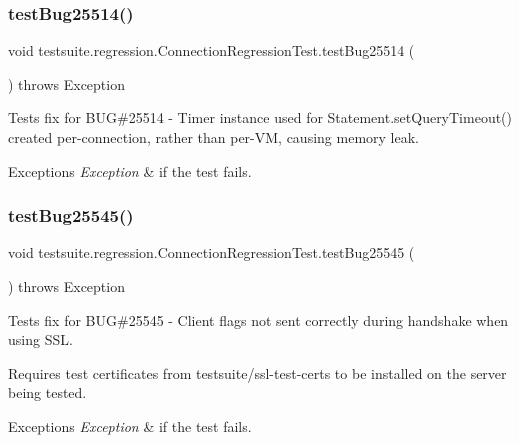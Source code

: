 \subsubsection{\texorpdfstring{test\+Bug25514()}{testBug25514()}}
{\footnotesize\ttfamily void testsuite.\+regression.\+Connection\+Regression\+Test.\+test\+Bug25514 (\begin{DoxyParamCaption}{ }\end{DoxyParamCaption}) throws Exception}

Tests fix for B\+UG\#25514 -\/ Timer instance used for Statement.\+set\+Query\+Timeout() created per-\/connection, rather than per-\/\+VM, causing memory leak.


\begin{DoxyExceptions}{Exceptions}
{\em Exception} & if the test fails. \\
\hline
\end{DoxyExceptions}
\mbox{\label{classtestsuite_1_1regression_1_1_connection_regression_test_a98a44b0432aebd94026747e6fce76282}} 
\subsubsection{\texorpdfstring{test\+Bug25545()}{testBug25545()}}
{\footnotesize\ttfamily void testsuite.\+regression.\+Connection\+Regression\+Test.\+test\+Bug25545 (\begin{DoxyParamCaption}{ }\end{DoxyParamCaption}) throws Exception}

Tests fix for B\+UG\#25545 -\/ Client flags not sent correctly during handshake when using S\+SL.

Requires test certificates from testsuite/ssl-\/test-\/certs to be installed on the server being tested.


\begin{DoxyExceptions}{Exceptions}
{\em Exception} & if the test fails. \\
\hline
\end{DoxyExceptions}
\mbox{\label{classtestsuite_1_1regression_1_1_connection_regression_test_af42d87028dfc5fe504f1cf4457c21d53}} 
